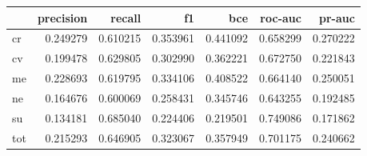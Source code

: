 \begin{tabular}{lrrrrrr}
\toprule
{} &  precision &    recall &        f1 &       bce &   roc-auc &    pr-auc \\
\midrule
cr  &   0.249279 &  0.610215 &  0.353961 &  0.441092 &  0.658299 &  0.270222 \\
cv  &   0.199478 &  0.629805 &  0.302990 &  0.362221 &  0.672750 &  0.221843 \\
me  &   0.228693 &  0.619795 &  0.334106 &  0.408522 &  0.664140 &  0.250051 \\
ne  &   0.164676 &  0.600069 &  0.258431 &  0.345746 &  0.643255 &  0.192485 \\
su  &   0.134181 &  0.685040 &  0.224406 &  0.219501 &  0.749086 &  0.171862 \\
tot &   0.215293 &  0.646905 &  0.323067 &  0.357949 &  0.701175 &  0.240662 \\
\bottomrule
\end{tabular}
